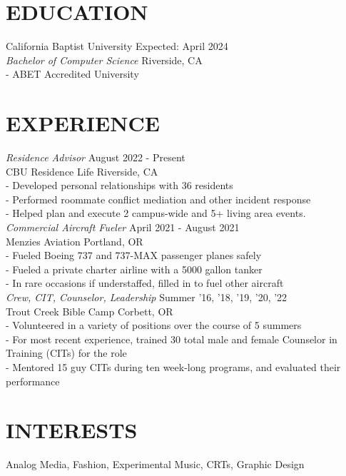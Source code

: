 \documentclass[line,margin]{res}
\begin{document}
\begin{resume}
\section{EDUCATION}
                    California Baptist University \hfill Expected: April 2024\\
                    {\sl Bachelor of Computer Science} \hfill Riverside, CA\\
                    - ABET Accredited University\\
                    
\section{EXPERIENCE}
                    {\sl Residence Advisor} \hfill August 2022 - Present\\
                    CBU Residence Life \hfill Riverside, CA\\
                    - Developed personal relationships with 36 residents\\
                    - Performed roommate conflict mediation and other incident response\\
                    - Helped plan and execute 2 campus-wide and 5+ living area events.\\

                    {\sl Commercial Aircraft Fueler} \hfill April 2021 - August 2021\\
                    Menzies Aviation \hfill Portland, OR\\
                    - Fueled Boeing 737 and 737-MAX passenger planes safely\\
                    - Fueled a private charter airline with a 5000 gallon tanker\\
                    - In rare occasions if understaffed, filled in to fuel other aircraft\\

                    {\sl Crew, CIT, Counselor, Leadership} \hfill Summer '16, '18, '19, '20, '22 \\
                    Trout Creek Bible Camp \hfill Corbett, OR\\
                    - Volunteered in a variety of positions over the course of 5 summers\\
                    - For most recent experience, trained 30 total male and female Counselor in Training (CITs) for the role\\
                    - Mentored 15 guy CITs during ten week-long programs, and evaluated their performance

\section{INTERESTS}
                    Analog Media, Fashion, Experimental Music, CRTs, Graphic Design
                   
\end{resume}
\end{document}
